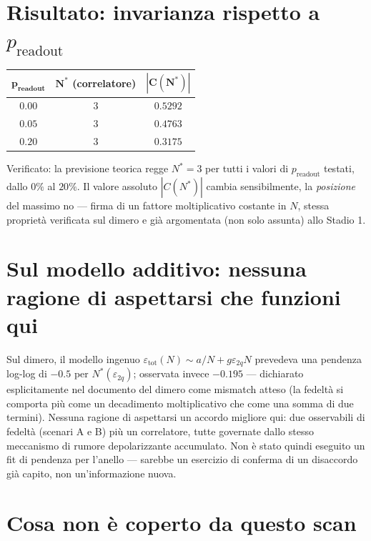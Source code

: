 \documentclass[11pt,a4paper]{article}
\begin{document}
\section{Risultato: invarianza rispetto a \texorpdfstring{$p_\text{readout}$}{p readout}}

\begin{center}
\renewcommand{\arraystretch}{1.2}
\begin{tabular}{@{}ccc@{}}
\toprule
$\boldsymbol{p_\text{readout}}$ & $\boldsymbol{N^*}$ (correlatore) & $|\boldsymbol{C(N^*)}|$\\
\midrule
$0.00$ & $3$ & $0.5292$\\
$0.05$ & $3$ & $0.4763$\\
$0.20$ & $3$ & $0.3175$\\
\bottomrule
\end{tabular}
\end{center}

\begin{okbox}{Verificato: la previsione teorica regge}
$N^*=3$ per tutti i valori di $p_\text{readout}$ testati, dallo $0\%$ al
$20\%$. Il valore assoluto $|C(N^*)|$ cambia sensibilmente, la
\emph{posizione} del massimo no --- firma di un fattore moltiplicativo
costante in $N$, stessa proprietà verificata sul dimero e già
argomentata (non solo assunta) allo Stadio 1.
\end{okbox}

\section{Sul modello additivo: nessuna ragione di aspettarsi che funzioni qui}

Sul dimero, il modello ingenuo $\varepsilon_\text{tot}(N)\sim
a/N+g\varepsilon_{2q}N$ prevedeva una pendenza log-log di $-0.5$ per
$N^*(\varepsilon_{2q})$; osservata invece $-0.195$ --- dichiarato
esplicitamente nel documento del dimero come mismatch atteso (la
fedeltà si comporta più come un decadimento moltiplicativo che come una
somma di due termini). Nessuna ragione di aspettarsi un accordo migliore
qui: due osservabili di fedeltà (scenari A e B) più un correlatore, tutte
governate dallo stesso meccanismo di rumore depolarizzante accumulato.
Non è stato quindi eseguito un fit di pendenza per l'anello --- sarebbe
un esercizio di conferma di un disaccordo già capito, non un'informazione
nuova.

\section{Cosa non è coperto da questo scan}
\end{document}
